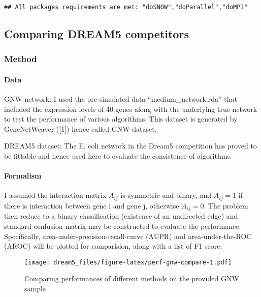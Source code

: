 \documentclass[]{article}
\title{}
\author{}
\date{15 March, 2018}
\let\oldparagraph\paragraph
\renewcommand{\paragraph}[1]{\oldparagraph{#1}\mbox{}}
\theoremstyle{definition}
\theoremstyle{definition}
\theoremstyle{definition}
\theoremstyle{remark}
\begin{document}
{
\setcounter{tocdepth}{2}
\tableofcontents
}
\begin{verbatim}
## All packages requirements are met: "doSNOW","doParallel","doMPI"
\end{verbatim}

\subsection{Comparing DREAM5
competitors}\label{comparing-dream5-competitors}

\subsubsection{Method}\label{method}

\paragraph{Data}\label{data}

GNW network: I used the pre-simulated data ``medium\_network.rda'' that
included the expression levels of 40 genes along with the underlying
true network to test the performance of various algorithms. This dataset
is generated by GeneNetWeaver ({[}1{]}) hence called GNW dataset.

DREAM5 dataset: The E. coli network in the Dream5 competition has proved
to be fittable and hence used here to evaluate the consistence of
algorithms.

\paragraph{Formalism}\label{formalism}

I assumed the interaction matrix \(A_{ij}\) is symmetric and binary, and
\(A_{ij}=1\) if there is interaction between gene i and gene j,
otherwise \(A_{ij}=0\). The problem then reduce to a binary
classification (existence of an undirected edge) and standard confusion
matrix may be constructed to evaluate the performance. Specifically,
area-under-precision-recall-curve (AUPR) and area-under-the-ROC (AROC)
will be plotted for comparision, along with a list of F1 score.

\begin{figure}
\centering
\texttt{[image: dream5\_files/figure-latex/perf-gnw-compare-1.pdf]}
\caption{\label{fig:perf-gnw-compare}Comparing performances of different
methods on the provided GNW sample}
\end{figure}
\end{document}
